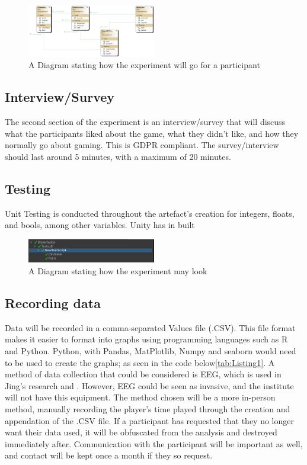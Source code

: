 \documentclass[conference]{IEEEtran}
\begin{document}
\begin{figure}[H]
\includegraphics[width = 0.5\textwidth]{UMLProcess}
\caption{A Diagram stating how the experiment will go for a participant}
\label{tab:figure3}
\end{figure}

\subsection{Interview/Survey}
The second section of the experiment is an interview/survey that will discuss what the participants liked about the game, what they didn't like, and how they normally go about gaming. This is GDPR compliant. The survey/interview should last around 5 minutes, with a maximum of 20 minutes.

\subsection{Testing}
Unit Testing is conducted throughout the artefact's creation for integers, floats, and bools, among other variables. Unity has in built 
\begin{figure}[H]
\begin{center}
\includegraphics[width = 0.5\textwidth, ]{Unittesting}
\caption{A Diagram stating how the experiment may look}
\label{tab:figure2}
\end{center}
\end{figure}

\subsection{Recording data}
Data will be recorded in a comma-separated Values file (.CSV). This file format makes it easier to format into graphs using programming languages such as R and Python. Python, with Pandas, MatPlotlib, Numpy and seaborn would need to be used to create the graphs; as seen in the code below\ref{tab:Listing1}. A method of data collection that could be considered is EEG, which is used in Jing's research \cite{Jing2024} and \cite{Ruqeyya2022}. However, EEG could be seen as invasive, and the institute will not have this equipment. The method chosen will be a more in-person method, manually recording the player's time played through the creation and appendation of the .CSV file. If a participant has requested that they no longer want their data used, it will be obfuscated from the analysis and destroyed immediately after. Communication with the participant will be important as well, and contact will be kept once a month if they so request.\\
\end{document}
